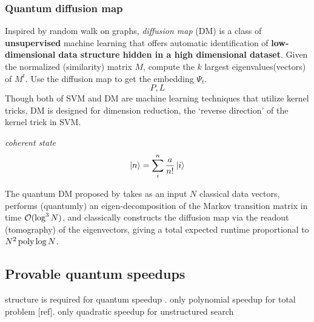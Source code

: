 \subsubsection{Quantum diffusion map}
Inspired by random walk on graphs, \emph{diffusion map} (DM) is a class of \textbf{unsupervised} machine learning that offers automatic identification of \textbf{low-dimensional data structure hidden in a high dimensional dataset}.
Given the normalized (similarity) matrix $M$, 
compute the $k$ largest eigenvalues(vectors) of $M^t$.
Use the diffusion map to get the embedding $\Psi_t$.
\begin{equation}
	P, L
\end{equation}
Though both of SVM and DM are machine learning techniques that utilize kernel tricks, DM is designed for dimension reduction, the `reverse direction' of the kernel trick in SVM.
\begin{definition}
	\emph{coherent state}
	\begin{equation}
		\ket{n} = \sum_{i}^n \frac{a}{n!} \ket{i}
	\end{equation}
\end{definition}
 \cite{chatterjeeGeneralizedCoherentStates2017}
The quantum DM proposed by \cite{sornsaengQuantumDiffusionMap2021} takes as an input $N$ classical data vectors, 
performs (quantumly) an eigen-decomposition of the Markov transition matrix in time $\mathcal{O}(\log^3 N)$, 
and classically constructs the diffusion map via the readout (tomography) of the eigenvectors, giving a total expected runtime proportional to $N^2 \operatorname{\textup{poly}}\log N$.


\subsection{Provable quantum speedups}
structure is required for quantum speedup
\cite{aaronsonNeedStructureQuantum2014}.
only polynomial speedup for total problem [ref].
only quadratic speedup for unstructured search \cite{groverQuantumMechanicsHelps1997}

